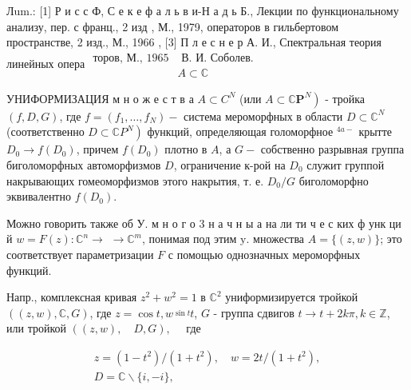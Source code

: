 \documentclass[10pt]{article}
\begin{document}
Лum.: [1] Р и с с Ф, С е к е ф а л ь в и-Н а д ь Б., Лекции по функциональному анализу, пер. с франц., 2 изд , М., 1979, операторов в гильбертовом пространстве, 2 изд., М., 1966 , [3] П л е с н е р А. И., Спектральная теория линейных опера$\begin{array}{ll}\text { торов, М., } 1965 & \text { В. И. Соболев. } \\ & A \subset \mathbb{C}\end{array}$



УНИФОРМИЗАЦИЯ м н о ж е с т в а $A \subset C^{N}$ (или $\left.A \subset \mathbb{C} \boldsymbol{P}^{N}\right)$ - тройка $(f, D, G)$, где $f=\left(f_{1}, \ldots, f_{N}\right)-$ система мероморфных в области $D \subset \mathbb{C}^{N}$ (соответственно $\left.D \subset \mathbb{C} P^{N}\right)$ функций, определяющая голоморфное ${ }^{4 a-}$ крытте $D_{0} \rightarrow f\left(D_{0}\right)$, причем $f\left(D_{0}\right)$ плотно в $A$, а $G-$ собственно разрывная группа биголоморфных автоморфизмов $D$, ограничение к-рой на $D_{0}$ служит группой накрывающих гомеоморфизмов этого накрытия, т. е. $D_{0} / G$ биголоморфно эквивалентно $f\left(D_{0}\right)$.



Можно говорить также об У. м н о г о 3 н а ч н ы а на ли ти ч е с ких ф унк ци й $w=F(z): \mathbb{C}^{n} \rightarrow$ $\rightarrow \mathbb{C}^{m}$, понимая под этим $\mathrm{y}$. множества $A=\{(z, w)\}$; это соответствует параметризации $F$ с помощью однозначных мероморфных функций.



Напр., комплексная кривая $z^{2}+w^{2}=1$ в $\mathbb{C}^{2}$ униформизируется тройкой $((z, w), \mathbb{C}, G)$, где $z=\cos t, w \stackrel{\sin t}{ } t$, $G$ - группа сдвигов $t \rightarrow t+2 k \pi, k \in \mathbb{Z}$, или тройкой $((z, w), \quad D, G), \quad$ где



\[

\begin{gathered}

z=\left(1-t^{2}\right) /\left(1+t^{2}\right), \quad w=2 t /\left(1+t^{2}\right), \\

D=\mathbb{C} \backslash\{i,-i\},

\end{gathered}

\]
\end{document}
